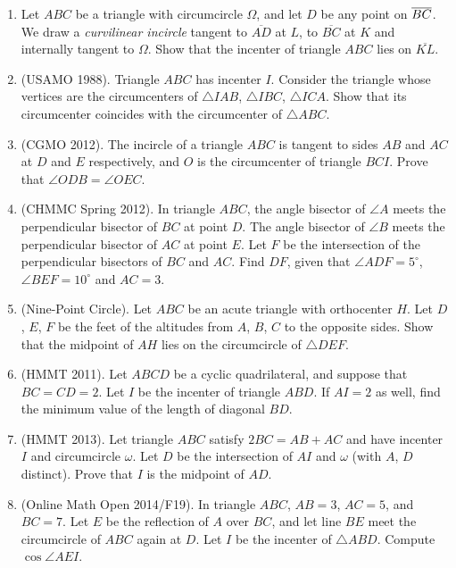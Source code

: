 \documentclass[11pt]{scrartcl}
\begin{document}
\begin{enumerate}[resume]
\item Let $ABC$ be a triangle with circumcircle $\Omega$, and let $D$ be any point on $\overline{BC}$. We draw a \emph{curvilinear incircle} tangent to $\overline{AD}$ at $L$, to $\overline{BC}$ at $K$ and internally tangent to $\Omega$. Show that the incenter of triangle $ABC$ lies on $\overline{KL}$.

\item (USAMO 1988). Triangle $ABC$ has incenter $I$. Consider the triangle whose vertices are the circumcenters of $\triangle IAB$, $\triangle IBC$, $\triangle ICA$. Show that its circumcenter coincides with the circumcenter of $\triangle ABC$.

\item (CGMO 2012). The incircle of a triangle $ABC$ is tangent to sides $AB$ and $AC$ at $D$ and $E$ respectively, and $O$ is the circumcenter of triangle $BCI$. Prove that $\angle ODB = \angle OEC$.

\item (CHMMC Spring 2012). In triangle $ABC$, the angle bisector of $\angle A$ meets the perpendicular bisector of $BC$ at point $D$. The angle bisector of $\angle B$ meets the perpendicular bisector of $AC$ at point $E$. Let $F$ be the intersection of the perpendicular bisectors of $BC$ and $AC$. Find $DF$, given that $\angle ADF = 5^\circ$, $\angle BEF = 10^\circ$ and $AC = 3$.

\item (Nine-Point Circle). Let $ABC$ be an acute triangle with orthocenter $H$. Let $D$, $E$, $F$ be the feet of the altitudes from $A$, $B$, $C$ to the opposite sides. Show that the midpoint of $AH$ lies on the circumcircle of $\triangle DEF$.

\item (HMMT 2011). Let $ABCD$ be a cyclic quadrilateral, and suppose that $BC = CD = 2$. Let $I$ be the incenter of triangle $ABD$. If $AI = 2$ as well, find the minimum value of the length of diagonal $BD$.

\item (HMMT 2013). Let triangle $ABC$ satisfy $2BC = AB + AC$ and have incenter $I$ and circumcircle $\omega$. Let $D$ be the intersection of $AI$ and $\omega$ (with $A$, $D$ distinct). Prove that $I$ is the midpoint of $AD$.

\item (Online Math Open 2014/F19). In triangle $ABC$, $AB = 3$, $AC = 5$, and $BC = 7$. Let $E$ be the reflection of $A$ over $BC$, and let line $BE$ meet the circumcircle of $ABC$ again at $D$. Let $I$ be the incenter of $\triangle ABD$. Compute $\cos \angle AEI$.


\end{enumerate}
\end{document}
